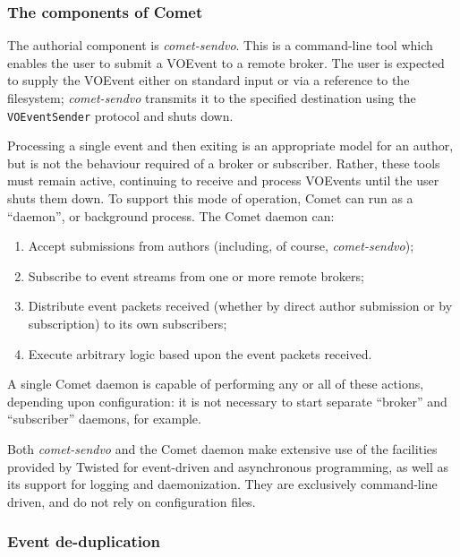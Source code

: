 \documentclass[5p,authoryear]{elsarticle}
\begin{document}
\subsubsection{The components of Comet}
\label{sec:design:components}

The authorial component is \textit{comet-sendvo}. This is a command-line tool
which enables the user to submit a VOEvent to a remote broker. The user is
expected to supply the VOEvent either on standard input or via a reference to
the filesystem; \textit{comet-sendvo} transmits it to the specified
destination using the \texttt{VOEventSender} protocol and shuts down.

Processing a single event and then exiting is an appropriate model for an
author, but is not the behaviour required of a broker or subscriber. Rather,
these tools must remain active, continuing to receive and process VOEvents
until the user shuts them down. To support this mode of operation, Comet can
run as a ``daemon'', or background process. The Comet daemon can:

\begin{enumerate}

  \item{Accept submissions from authors (including, of course, \textit{comet-sendvo});}

  \item{Subscribe to event streams from one or more remote brokers;}

  \item{Distribute event packets received (whether by direct author submission or by subscription) to its own subscribers;}

  \item{Execute arbitrary logic based upon the event packets received.}

\end{enumerate}

A single Comet daemon is capable of performing any or all of these actions,
depending upon configuration: it is not necessary to start separate ``broker''
and ``subscriber'' daemons, for example.

Both \textit{comet-sendvo} and the Comet daemon make extensive use of the
facilities provided by Twisted for event-driven and asynchronous programming,
as well as its support for logging and daemonization. They are exclusively
command-line driven, and do not rely on configuration files.

\subsubsection{Event de-duplication}
\label{sec:design:dedup}
\end{document}
